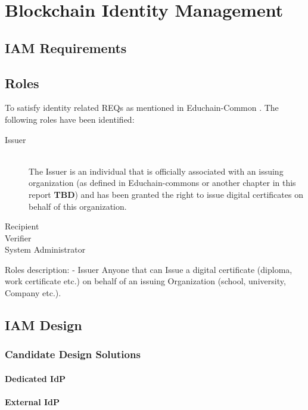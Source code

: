 \chapter{Blockchain Identity Management}

\section{IAM Requirements} \label{ch:educhain-iam-reqs}

\section{Roles} \label{ch:educhain-roles}

To satisfy identity related REQs as mentioned in Educhain-Common \cite{educhain-common}. The following roles have been identified:

\begin{description}
	\item[Issuer] \hfill \\
	The Issuer is an individual that is officially associated with an issuing organization (as defined in Educhain-commons or another chapter in this report \textbf{TBD}) and has been granted the right to issue digital certificates on behalf of this organization.
	\item[Recipient]
	\item[Verifier]
	\item[System Administrator]  
\end{description}


Roles description:
- Issuer Anyone that can Issue a digital certificate (diploma, work certificate etc.) on behalf of an issuing Organization (school, university, Company etc.).

\section{IAM Design}

\subsection{Candidate Design Solutions}

\subsubsection{Dedicated IdP}

\subsubsection{External IdP}

